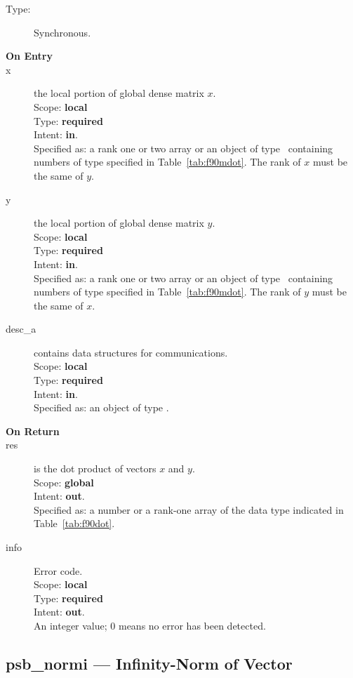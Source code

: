 \begin{description}
\item[Type:] Synchronous.
\item[\bf On Entry]
\item[x] the local portion of global dense matrix
$x$. \\
Scope: {\bf local} \\
Type: {\bf required} \\
Intent: {\bf in}.\\
Specified as:  a rank one or two array or an object of type \vdata\
containing numbers of type specified in
Table~\ref{tab:f90mdot}. The rank of $x$ must be the same of $y$.
\item[y] the local portion of global dense matrix
$y$. \\
Scope: {\bf local} \\
Type: {\bf required} \\
Intent: {\bf in}.\\
Specified as:  a rank one or two array or an object of type \vdata\
containing numbers of type specified in
Table~\ref{tab:f90mdot}. The rank of $y$ must be the same of $x$.
\item[desc\_a] contains data structures for communications.\\
Scope: {\bf local} \\
Type: {\bf required}\\
Intent: {\bf in}.\\
Specified as: an object of type \descdata.
\item[\bf On Return]
\item[res] is the dot product of vectors $x$ and $y$.\\
Scope: {\bf global} \\
Intent: {\bf out}.\\
Specified as: a number or a rank-one array  of the data type indicated
in Table~\ref{tab:f90dot}.
\item[info] Error code.\\
Scope: {\bf local} \\
Type: {\bf required} \\
Intent: {\bf out}.\\
An integer value; 0 means no error has been detected.
\end{description}

%
%


\clearpage\subsection{psb\_normi --- Infinity-Norm of Vector}

